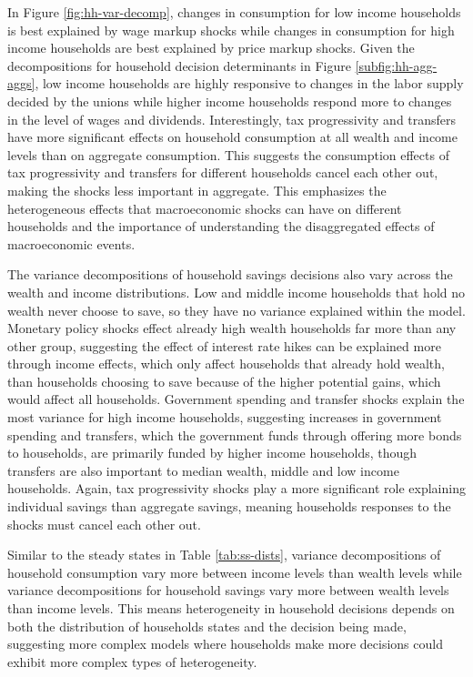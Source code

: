 In Figure \ref{fig:hh-var-decomp}, changes in consumption for low income households is best explained by wage markup shocks while changes in consumption for high income households are best explained by price markup shocks. Given the decompositions for household decision determinants in Figure \ref{subfig:hh-agg-aggs}, low income households are highly responsive to changes in the labor supply decided by the unions while higher income households respond more to changes in the level of wages and dividends. Interestingly, tax progressivity and transfers have more significant effects on household consumption at all wealth and income levels than on aggregate consumption. This suggests the consumption effects of tax progressivity and transfers for different households cancel each other out, making the shocks less important in aggregate. This emphasizes the heterogeneous effects that macroeconomic shocks can have on different households and the importance of understanding the disaggregated effects of macroeconomic events.

The variance decompositions of household savings decisions also vary across the wealth and income distributions. Low and middle income households that hold no wealth never choose to save, so they have no variance explained within the model. Monetary policy shocks effect already high wealth households far more than any other group, suggesting the effect of interest rate hikes can be explained more through income effects, which only affect households that already hold wealth, than households choosing to save because of the higher potential gains, which would affect all households. Government spending and transfer shocks explain the most variance for high income households, suggesting increases in government spending and transfers, which the government funds through offering more bonds to households, are primarily funded by higher income households, though transfers are also important to median wealth, middle and low income households. Again, tax progressivity shocks play a more significant role explaining individual savings than aggregate savings, meaning households responses to the shocks must cancel each other out.

Similar to the steady states in Table \ref{tab:ss-dists}, variance decompositions of household consumption vary more between income levels than wealth levels while variance decompositions for household savings vary more between wealth levels than income levels. This means heterogeneity in household decisions depends on both the distribution of households states and the decision being made, suggesting more complex models where households make more decisions could exhibit more complex types of heterogeneity.  
